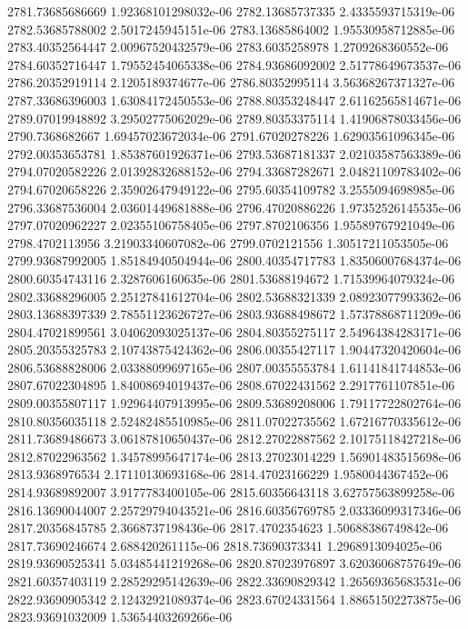 {2781.73685686669 1.92368101298032e-06
2782.13685737335 2.4335593715319e-06
2782.53685788002 2.5017245945151e-06
2783.13685864002 1.95530958712885e-06
2783.40352564447 2.00967520432579e-06
2783.6035258978 1.2709268360552e-06
2784.60352716447 1.79552454065338e-06
2784.93686092002 2.51778649673537e-06
2786.20352919114 2.1205189374677e-06
2786.80352995114 3.56368267371327e-06
2787.33686396003 1.63084172450553e-06
2788.80353248447 2.61162565814671e-06
2789.07019948892 3.29502775062029e-06
2789.80353375114 1.41906878033456e-06
2790.7368682667 1.69457023672034e-06
2791.67020278226 1.62903561096345e-06
2792.00353653781 1.85387601926371e-06
2793.53687181337 2.02103587563389e-06
2794.07020582226 2.01392832688152e-06
2794.33687282671 2.04821109783402e-06
2794.67020658226 2.35902647949122e-06
2795.60354109782 3.2555094698985e-06
2796.33687536004 2.03601449681888e-06
2796.47020886226 1.97352526145535e-06
2797.07020962227 2.02355106758405e-06
2797.8702106356 1.95589767921049e-06
2798.4702113956 3.21903340607082e-06
2799.0702121556 1.30517211053505e-06
2799.93687992005 1.85184940504944e-06
2800.40354717783 1.83506007684374e-06
2800.60354743116 2.3287606160635e-06
2801.53688194672 1.71539964079324e-06
2802.33688296005 2.25127841612704e-06
2802.53688321339 2.08923077993362e-06
2803.13688397339 2.78551123626727e-06
2803.93688498672 1.57378868711209e-06
2804.47021899561 3.04062093025137e-06
2804.80355275117 2.54964384283171e-06
2805.20355325783 2.10743875424362e-06
2806.00355427117 1.90447320420604e-06
2806.53688828006 2.03388099697165e-06
2807.00355553784 1.61141841744853e-06
2807.67022304895 1.84008694019437e-06
2808.67022431562 2.2917761107851e-06
2809.00355807117 1.92964407913995e-06
2809.53689208006 1.79117722802764e-06
2810.80356035118 2.52482485510985e-06
2811.07022735562 1.67216770335612e-06
2811.73689486673 3.06187810650437e-06
2812.27022887562 2.10175118427218e-06
2812.87022963562 1.34578995647174e-06
2813.27023014229 1.56901483515698e-06
2813.9368976534 2.17110130693168e-06
2814.47023166229 1.9580044367452e-06
2814.93689892007 3.9177783400105e-06
2815.60356643118 3.62757563899258e-06
2816.13690044007 2.25729794043521e-06
2816.60356769785 2.03336099317346e-06
2817.20356845785 2.3668737198436e-06
2817.4702354623 1.50688386749842e-06
2817.73690246674 2.688420261115e-06
2818.73690373341 1.2968913094025e-06
2819.93690525341 5.03485441219268e-06
2820.87023976897 3.62036068757649e-06
2821.60357403119 2.28529295142639e-06
2822.33690829342 1.26569365683531e-06
2822.93690905342 2.12432921089374e-06
2823.67024331564 1.88651502273875e-06
2823.93691032009 1.53654403269266e-06
}
